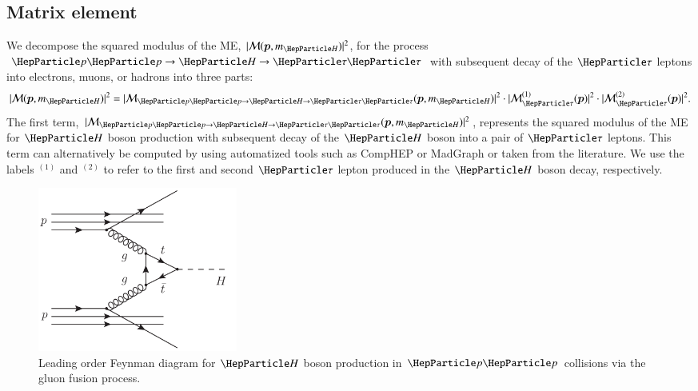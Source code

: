 \subsection{Matrix element}
\label{sec:mem_ME}

We decompose the squared modulus of the ME, $\vert \mathcal{M}(\bm{p},m_{\PHiggs}) \vert^{2}$, for the process $\Pp\Pp \to \PHiggs \to \Pgt\Pgt$
with subsequent decay of the $\Pgt$ leptons into electrons, muons, or
hadrons into three parts:
\begin{equation}
\vert \mathcal{M}(\bm{p},m_{\PHiggs}) \vert^{2} = 
 \vert \mathcal{M}_{\Pp\Pp \to \PHiggs \to \Pgt\Pgt}(\bm{p},m_{\PHiggs}) \vert^{2} 
\cdot \vert \mathcal{M}^{(1)}_{\Pgt}(\bm{p}) \vert^{2} 
\cdot \vert \mathcal{M}^{(2)}_{\Pgt}(\bm{p}) \vert^{2} .
 \label{eq:meFactorization}
\end{equation}
The first term, $\vert \mathcal{M}_{\Pp\Pp \to \PHiggs \to
  \Pgt\Pgt}(\bm{p},m_{\PHiggs}) \vert^{2}$, represents the squared
modulus of the ME for $\PHiggs$ boson production with subsequent decay of the $\PHiggs$ boson into a pair of $\Pgt$ leptons.
This term can alternatively be computed by using automatized tools such as CompHEP or MadGraph or taken from the literature.
We use the labels $^{(1)}$ and $^{(2)}$ to refer to the first and second $\Pgt$ lepton produced in the $\PHiggs$ boson decay, respectively.

\begin{figure}
\begin{center}
\includegraphics*[height=54mm]{figures/ggH_FeynmanDiagram.pdf}
\end{center}
\caption{
  Leading order Feynman diagram for $\PHiggs$ boson production in $\Pp\Pp$ collisions via the gluon fusion process.
}
\label{fig:ggH_FeynmanDiagram}
\end{figure}

